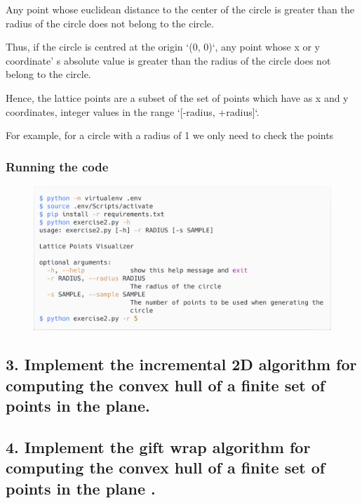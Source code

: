 \documentclass[12pt]{article}
\newenvironment{matlab}
	{\begin{figure}[hp]\centering\captionsetup{justification=centering}}
	{\end{figure}}
\begin{document}
Any point whose euclidean distance to the center of the circle is greater than the radius of the circle does not belong to the circle.

Thus, if the circle is centred at the origin `(0, 0)`, any point whose x or y coordinate' s absolute value is greater than the radius of the circle does not belong to the circle.

Hence, the lattice points are a subset of the set of points which have as x and y coordinates, integer values in the range `[-radius, +radius]`.

For example, for a circle with a radius of 1 we only need to check the points

\subsubsection*{Running the code}

\begin{matlab}
    \includegraphics[scale=0.140]{images/exercise2.png}
\end{matlab}

\pagebreak

\subsection*{3. Implement the incremental 2D algorithm for computing the convex hull of a
    finite set of points in the plane.}

\vspace{2in}

\pagebreak

\subsection*{4. Implement the gift wrap algorithm for computing the convex hull of a finite
    set of points in the plane .}
\end{document}
